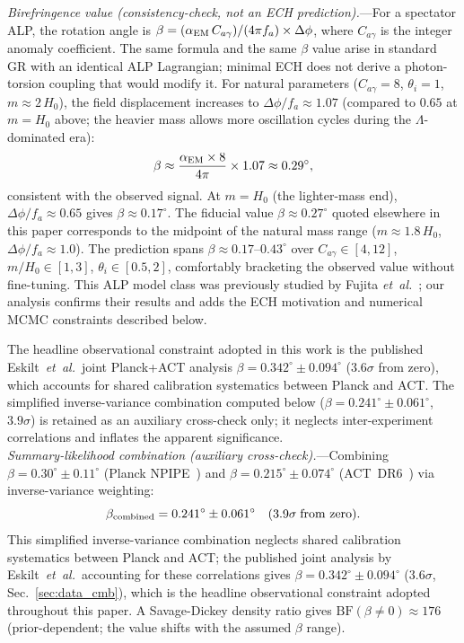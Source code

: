 \documentclass[aps,prd,twocolumn,superscriptaddress,showpacs,preprintnumbers,nofootinbib,longbibliography,floatfix]{revtex4-2}
\newcommand{\etal}{\textit{et~al.}}
\begin{document}
\textit{Birefringence value (consistency-check, not an ECH prediction).}---For a spectator ALP, the rotation angle is $\beta = (\alpha_{\rm EM}\,C_{a\gamma})/(4\pi f_a) \times \Delta\phi$, where $C_{a\gamma}$ is the integer anomaly coefficient. The same formula and the same $\beta$ value arise in standard GR with an identical ALP Lagrangian; minimal ECH does not derive a photon-torsion coupling that would modify it. For natural parameters ($C_{a\gamma} = 8$, $\theta_i = 1$, $m \approx 2\,H_0$), the field displacement increases to $\Delta\phi/f_a \approx 1.07$ (compared to $0.65$ at $m = H_0$ above; the heavier mass allows more oscillation cycles during the $\Lambda$-dominated era):
\begin{equation}
\beta \approx \frac{\alpha_{\rm EM} \times 8}{4\pi} \times 1.07 \approx 0.29^\circ,
\end{equation}
consistent with the observed signal.  At $m = H_0$ (the lighter-mass end), $\Delta\phi/f_a \approx 0.65$ gives $\beta \approx 0.17^\circ$. The fiducial value $\beta \approx 0.27^\circ$ quoted elsewhere in this paper corresponds to the midpoint of the natural mass range ($m \approx 1.8\,H_0$, $\Delta\phi/f_a \approx 1.0$). The prediction spans $\beta \approx 0.17$--$0.43^\circ$ over $C_{a\gamma} \in [4,12]$, $m/H_0 \in [1,3]$, $\theta_i \in [0.5,2]$, comfortably bracketing the observed value without fine-tuning. This ALP model class was previously studied by Fujita \etal~\cite{Fujita2021}; our analysis confirms their results and adds the ECH motivation and numerical MCMC constraints described below.

The headline observational constraint adopted in this work is the published Eskilt~\etal\ joint Planck+ACT analysis $\beta = 0.342^\circ \pm 0.094^\circ$ ($3.6\sigma$ from zero), which accounts for shared calibration systematics between Planck and ACT. The simplified inverse-variance combination computed below ($\beta = 0.241^\circ \pm 0.061^\circ$, $3.9\sigma$) is retained as an auxiliary cross-check only; it neglects inter-experiment correlations and inflates the apparent significance.\\

\textit{Summary-likelihood combination (auxiliary cross-check).}---Combining $\beta = 0.30^\circ \pm 0.11^\circ$ (Planck NPIPE~\cite{Eskilt2022}) and $\beta = 0.215^\circ \pm 0.074^\circ$ (ACT~DR6~\cite{DiegoPalazuelos2025}) via inverse-variance weighting:
\begin{equation}
\beta_{\rm combined} = 0.241^\circ \pm 0.061^\circ \quad (3.9\sigma\;\text{from zero}).
\label{eq:beta_combined}
\end{equation}
This simplified inverse-variance combination neglects shared calibration systematics between Planck and ACT; the published joint analysis by Eskilt~\etal\ accounting for these correlations gives $\beta = 0.342^\circ \pm 0.094^\circ$ ($3.6\sigma$, Sec.~\ref{sec:data_cmb}), which is the headline observational constraint adopted throughout this paper. A Savage-Dickey density ratio gives $\mathrm{BF}(\beta \neq 0) \approx 176$ (prior-dependent; the value shifts with the assumed $\beta$ range).
\end{document}
